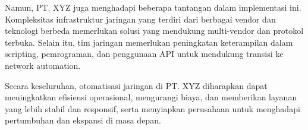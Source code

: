 {Namun, PT. XYZ juga menghadapi beberapa tantangan dalam implementasi ini. Kompleksitas infrastruktur jaringan yang terdiri dari berbagai vendor dan teknologi berbeda memerlukan solusi yang mendukung multi-vendor dan protokol terbuka. Selain itu, tim jaringan memerlukan peningkatan keterampilan dalam scripting, pemrograman, dan penggunaan API untuk mendukung transisi ke network automation.

Secara keseluruhan, otomatisasi jaringan di PT. XYZ diharapkan dapat meningkatkan efisiensi operasional, mengurangi biaya, dan memberikan layanan yang lebih stabil dan responsif, serta menyiapkan perusahaan untuk menghadapi pertumbuhan dan ekspansi di masa depan.

	\bigskip

}

\newpage